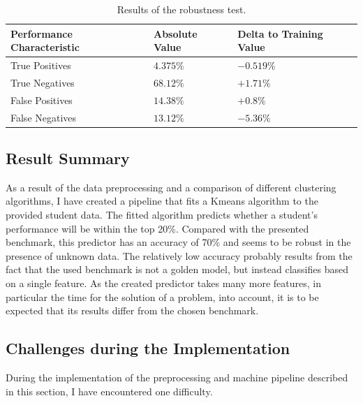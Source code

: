 \begin{table}[b]
	\centering
	\caption{Results of the robustness test.\label{tab_robustness}}
	\begin{tabular}{lll}
		\toprule
		Performance Characteristic & Absolute Value & Delta to Training Value \\		
		\midrule
		True Positives & $4.375\%$ & $-0.519\%$\\
		True Negatives & $68.12\%$ & $+1.71\%$\\
		False Positives & $14.38\%$ & $+0.8\%$\\
		False Negatives & $13.12\%$ & $-5.36\%$\\
		\bottomrule
	\end{tabular}
\end{table}

\subsection{Result Summary}
As a result of the data preprocessing and a comparison of different clustering algorithms, I have created a pipeline that fits a Kmeans algorithm to the provided student data. The fitted algorithm predicts whether a student's performance will be within the top 20\%. Compared with the presented benchmark, this predictor has an accuracy of 70\% and seems to be robust in the presence of unknown data. The relatively low accuracy probably results from the fact that the used benchmark is not a golden model, but instead classifies based on a single feature. As the created predictor takes many more features, in particular the time for the solution of a problem, into account, it is to be expected that its results differ from the chosen benchmark.

\subsection{Challenges during the Implementation}
During the implementation of the preprocessing and machine pipeline described in this section, I have encountered one difficulty.


